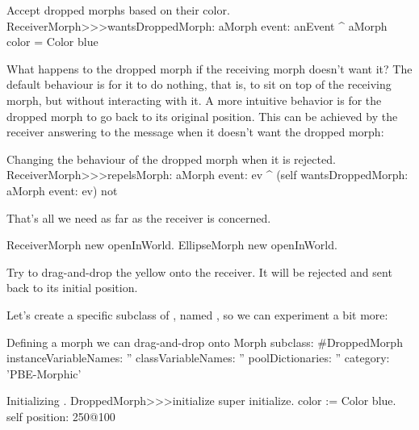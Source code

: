 \documentclass[a4paper,10pt,twoside]{book}
\begin{document}
\begin{method}{Accept dropped morphs based on their color.}
ReceiverMorph>>>wantsDroppedMorph: aMorph event: anEvent
	^ aMorph color = Color blue
\end{method}

What happens to the dropped morph if the receiving morph doesn't want it?  The default behaviour is for it to do nothing, that is, to sit on top of the receiving morph, but without interacting with it.  A more intuitive behavior is for the dropped morph to go back to its original position.  This can be achieved by the receiver answering  to the message  when it doesn't want the dropped morph:

\begin{method}{Changing the behaviour of the dropped morph when it is rejected.}
ReceiverMorph>>>repelsMorph: aMorph event: ev
	^ (self wantsDroppedMorph: aMorph event: ev) not
\end{method}

That's all we need as far as the receiver is concerned.

\begin{code}{}
ReceiverMorph new openInWorld.
EllipseMorph new openInWorld.
\end{code}
\noindent
Try to drag-and-drop the yellow  onto the receiver. It will be rejected and sent back to its initial position.


Let's create a specific subclass of , named , so we can experiment a bit more:

\begin{classdef}{Defining a morph we can drag-and-drop onto }
Morph subclass: #DroppedMorph
	instanceVariableNames: ''
	classVariableNames: ''
	poolDictionaries: ''
	category: 'PBE-Morphic'
\end{classdef}

\begin{method}{Initializing .}
DroppedMorph>>>initialize
	super initialize.
	color := Color blue.
	self position: 250@100
\end{method}
\end{document}
